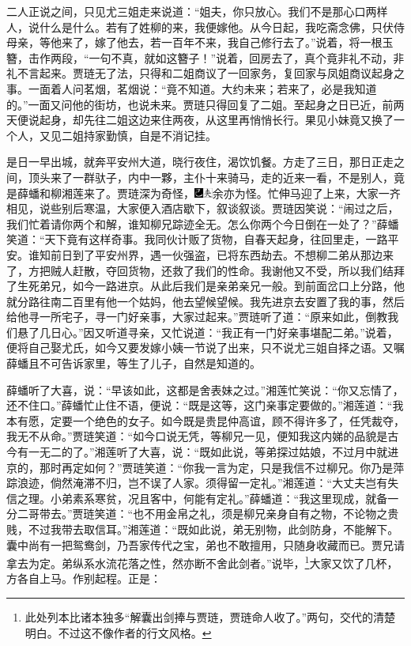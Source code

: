 二人正说之间，只见尤三姐走来说道：“姐夫，你只放心。我们不是那心口两样人，说什么是什么。若有了姓柳的来，我便嫁他。从今日起，我吃斋念佛，只伏侍母亲，等他来了，嫁了他去，若一百年不来，我自己修行去了。”说着，将一根玉簪，击作两段，“一句不真，就如这簪子！”说着，回房去了，真个竟非礼不动，非礼不言起来。贾琏无了法，只得和二姐商议了一回家务，复回家与凤姐商议起身之事。一面着人问茗烟，茗烟说：“竟不知道。大约未来；若来了，必是我知道的。”一面又问他的街坊，也说未来。贾琏只得回复了二姐。至起身之日已近，前两天便说起身，却先往二姐这边来住两夜，从这里再悄悄长行。果见小妹竟又换了一个人，又见二姐持家勤慎，自是不消记挂。

是日一早出城，就奔平安州大道，晓行夜住，渴饮饥餐。方走了三日，那日正走之间，顶头来了一群驮子，内中一夥，主仆十来骑马，走的近来一看，不是别人，竟是薛蟠和柳湘莲来了。贾琏深为奇怪，{\includegraphics[width=3mm]{../Images/00003}\includegraphics[width=3mm]{../Images/00012}\footnotesize \kaishu 余亦为怪。}忙伸马迎了上来，大家一齐相见，说些别后寒温，大家便入酒店歇下，叙谈叙谈。贾琏因笑说：“闹过之后，我们忙着请你两个和解，谁知柳兄踪迹全无。怎么你两个今日倒在一处了？”薛蟠笑道：“天下竟有这样奇事。我同伙计贩了货物，自春天起身，往回里走，一路平安。谁知前日到了平安州界，遇一伙强盗，已将东西劫去。不想柳二弟从那边来了，方把贼人赶散，夺回货物，还救了我们的性命。我谢他又不受，所以我们结拜了生死弟兄，如今一路进京。从此后我们是亲弟亲兄一般。到前面岔口上分路，他就分路往南二百里有他一个姑妈，他去望候望候。我先进京去安置了我的事，然后给他寻一所宅子，寻一门好亲事，大家过起来。”贾琏听了道：“原来如此，倒教我们悬了几日心。”因又听道寻亲，又忙说道：“我正有一门好亲事堪配二弟。”说着，便将自己娶尤氏，如今又要发嫁小姨一节说了出来，只不说尤三姐自择之语。又嘱薛蟠且不可告诉家里，等生了儿子，自然是知道的。

薛蟠听了大喜，说：“早该如此，这都是舍表妹之过。”湘莲忙笑说：“你又忘情了，还不住口。”薛蟠忙止住不语，便说：“既是这等，这门亲事定要做的。”湘莲道：“我本有愿，定要一个绝色的女子。如今既是贵昆仲高谊，顾不得许多了，任凭裁夺，我无不从命。”贾琏笑道：“如今口说无凭，等柳兄一见，便知我这内娣的品貌是古今有一无二的了。”湘莲听了大喜，说：“既如此说，等弟探过姑娘，不过月中就进京的，那时再定如何？”贾琏笑道：“你我一言为定，只是我信不过柳兄。你乃是萍踪浪迹，倘然淹滞不归，岂不误了人家。须得留一定礼。”湘莲道：“大丈夫岂有失信之理。小弟素系寒贫，况且客中，何能有定礼。”薛蟠道：“我这里现成，就备一分二哥带去。”贾琏笑道：“也不用金帛之礼，须是柳兄亲身自有之物，不论物之贵贱，不过我带去取信耳。”湘莲道：“既如此说，弟无别物，此剑防身，不能解下。囊中尚有一把鸳鸯剑，乃吾家传代之宝，弟也不敢擅用，只随身收藏而已。贾兄请拿去为定。弟纵系水流花落之性，然亦断不舍此剑者。”说毕，\footnote{此处列本比诸本独多“解囊出剑捧与贾琏，贾琏命人收了。”两句，交代的清楚明白。不过这不像作者的行文风格。}大家又饮了几杯，方各自上马。作别起程。正是：

